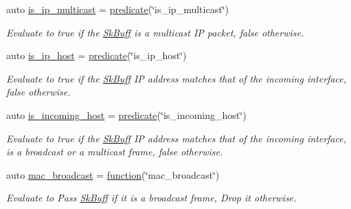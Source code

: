 \begin{DoxyCompactItemize}
auto \hyperlink{namespacepfq_1_1lang_1_1experimental_1_1anonymous__namespace_02experimental_8hpp_03_a6b14037fa990cc066d69c9f491345156}{is\+\_\+ip\+\_\+multicast} = \hyperlink{namespacepfq_1_1lang_aca9adafc436b7f851621b979fa1aaf88}{predicate}(\char`\"{}is\+\_\+ip\+\_\+multicast\char`\"{})
\begin{DoxyCompactList}\small\item\em Evaluate to {\ttfamily true} if the \hyperlink{structpfq_1_1lang_1_1SkBuff}{Sk\+Buff} is a multicast IP packet, {\ttfamily false} otherwise. \end{DoxyCompactList}\item 
auto \hyperlink{namespacepfq_1_1lang_1_1experimental_1_1anonymous__namespace_02experimental_8hpp_03_a323f07b8b6098198779c19fdf4c95837}{is\+\_\+ip\+\_\+host} = \hyperlink{namespacepfq_1_1lang_aca9adafc436b7f851621b979fa1aaf88}{predicate}(\char`\"{}is\+\_\+ip\+\_\+host\char`\"{})
\begin{DoxyCompactList}\small\item\em Evaluate to {\ttfamily true} if the \hyperlink{structpfq_1_1lang_1_1SkBuff}{Sk\+Buff} IP address matches that of the incoming interface, {\ttfamily false} otherwise. \end{DoxyCompactList}\item 
auto \hyperlink{namespacepfq_1_1lang_1_1experimental_1_1anonymous__namespace_02experimental_8hpp_03_aa75d253ac688edcdbfc80160eba5678e}{is\+\_\+incoming\+\_\+host} = \hyperlink{namespacepfq_1_1lang_aca9adafc436b7f851621b979fa1aaf88}{predicate}(\char`\"{}is\+\_\+incoming\+\_\+host\char`\"{})
\begin{DoxyCompactList}\small\item\em Evaluate to {\ttfamily true} if the \hyperlink{structpfq_1_1lang_1_1SkBuff}{Sk\+Buff} IP address matches that of the incoming interface, is a broadcast or a multicast frame, {\ttfamily false} otherwise. \end{DoxyCompactList}\item 
auto \hyperlink{namespacepfq_1_1lang_1_1experimental_1_1anonymous__namespace_02experimental_8hpp_03_aa889cbcf0c306d992508759fc5e677cd}{mac\+\_\+broadcast} = \hyperlink{namespacepfq_1_1lang_a1a4638059d700ae08d0ca63886ff2bb3}{function}(\char`\"{}mac\+\_\+broadcast\char`\"{})
\begin{DoxyCompactList}\small\item\em Evaluate to {\ttfamily Pass} \hyperlink{structpfq_1_1lang_1_1SkBuff}{Sk\+Buff} if it is a broadcast frame, {\ttfamily Drop} it otherwise. \end{DoxyCompactList}\item 

\end{DoxyCompactItemize}
